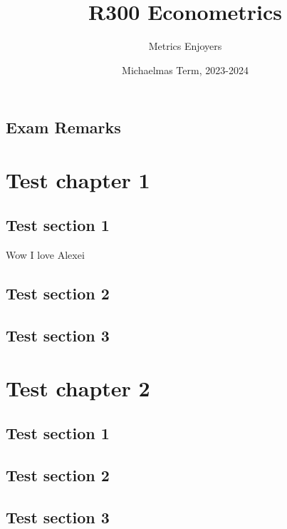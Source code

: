 \documentclass[DIV=14,titlepage=false]{scrreprt}
\title{%
R300 Econometrics}
\author{Metrics Enjoyers}
\date{Michaelmas Term, 2023-2024}
\begin{document}
\maketitle

\tableofcontents
\newpage

\section{Exam Remarks}

\chapter{Test chapter 1}
\section{Test section 1}
Wow I love Alexei
\section{Test section 2}
\section{Test section 3}
\chapter{Test chapter 2}
\section{Test section 1}
\section{Test section 2}
\section{Test section 3}
\end{document}
